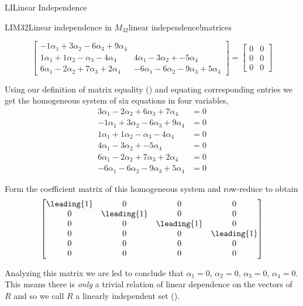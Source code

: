 \begin{subsect}{LI}{Linear Independence}
\begin{example}{LIM32}{Linear independence in $M_{32}$}{linear independence!matrices}
\begin{para}
\begin{equation*}
\begin{bmatrix}
-1\alpha_1+3\alpha_2-6\alpha_3+9\alpha_4 \\
1\alpha_1+1\alpha_2-\alpha_3-4\alpha_4 &
4\alpha_1-3\alpha_2+            -5\alpha_4 \\
6\alpha_1-2\alpha_2+7\alpha_3+2\alpha_4 &
-6\alpha_1-6\alpha_2-9\alpha_3+5\alpha_4
\end{bmatrix}
=\begin{bmatrix}
0&0\\0&0\\0&0
\end{bmatrix}
\end{equation*}
\end{para}
%
\begin{para}Using our definition of matrix equality () and equating corresponding entries we get the homogeneous system of six equations in four variables,
%
\begin{align*}
3\alpha_1-2\alpha_2+6\alpha_3+7\alpha_4&=0\\
-1\alpha_1+3\alpha_2-6\alpha_3+9\alpha_4&=0\\
1\alpha_1+1\alpha_2-\alpha_3-4\alpha_4&=0\\
4\alpha_1-3\alpha_2+            -5\alpha_4&=0\\
6\alpha_1-2\alpha_2+7\alpha_3+2\alpha_4&=0\\
-6\alpha_1-6\alpha_2-9\alpha_3+5\alpha_4&=0
\end{align*}
\end{para}
%
\begin{para}Form the coefficient matrix of this homogeneous system and row-reduce to obtain
%
\begin{equation*}
\begin{bmatrix}
\leading{1} & 0 & 0 & 0\\
0 & \leading{1} & 0 & 0\\
0 & 0 & \leading{1} & 0\\
0 & 0 & 0 & \leading{1}\\
0 & 0 & 0 & 0\\
0 & 0 & 0 & 0
\end{bmatrix}
\end{equation*}
\end{para}
%
\begin{para}Analyzing this matrix we are led to conclude that $\alpha_1=0$, $\alpha_2=0$, $\alpha_3=0$, $\alpha_4=0$.  This means there is {\em only} a trivial relation of linear dependence on the vectors of $R$ and so we call $R$ a linearly independent set ().\end{para}

\end{example}
\end{subsect}
